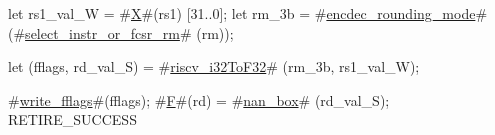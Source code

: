 let rs1_val_W = #\hyperref[sailRISCVzX]{X}#(rs1) [31..0];
let rm_3b     = #\hyperref[sailRISCVzencdeczyroundingzymode]{encdec\_rounding\_mode}# (#\hyperref[sailRISCVzselectzyinstrzyorzyfcsrzyrm]{select\_instr\_or\_fcsr\_rm}#  (rm));

let (fflags, rd_val_S) = #\hyperref[sailRISCVzriscvzyi32ToF32]{riscv\_i32ToF32}# (rm_3b, rs1_val_W);

#\hyperref[sailRISCVzwritezyfflags]{write\_fflags}#(fflags);
#\hyperref[sailRISCVzF]{F}#(rd) = #\hyperref[sailRISCVznanzybox]{nan\_box}# (rd_val_S);
RETIRE_SUCCESS
